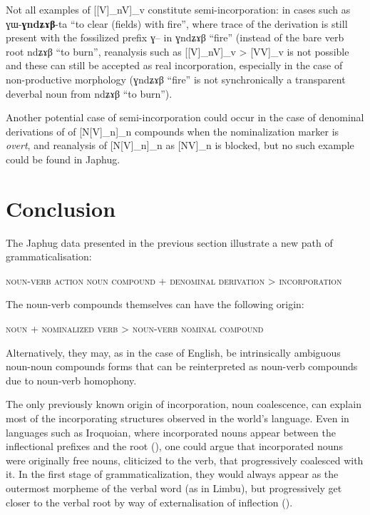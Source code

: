 \documentclass[oldfontcommands,oneside,a4paper,11pt]{article}
\newcommand{\ipa}[1]{{\phon #1}} %
\begin{document}
Not all examples of [[V]_nV]_v constitute semi-incorporation: in cases such as \ipa{ɣɯ-\textbf{ɣndʑɤβ}-ta} ``to clear (fields) with fire'', where trace of the derivation is still present with the  fossilized prefix \ipa{ɣ}-- in \ipa{ɣndʑɤβ} ``fire'' (instead of the bare verb root \ipa{ndʑɤβ} ``to burn'', reanalysis such as [[V]_nV]_v > [VV]_v is not possible and these can still be accepted as real incorporation, especially in the case of non-productive morphology (\ipa{ɣndʑɤβ} ``fire'' is not synchronically a transparent deverbal noun from \ipa{ndʑɤβ} ``to burn'').

Another potential case of semi-incorporation could occur in the case of denominal derivations of  of [N[V]_n]_n compounds  when the nominalization marker is \textit{overt}, and reanalysis of [N[V]_n]_n as [NV]_n is blocked, but no such example could be found in Japhug.

\section{Conclusion}
The Japhug data presented in the previous section illustrate a new path of grammaticalisation:

 \begin{exe}
\ex
 \glt  \textsc{noun-verb action noun compound} + \textsc{denominal derivation} > \textsc{incorporation}
\end{exe} 

The noun-verb compounds themselves can have the following origin:
 \begin{exe}
\ex
 \glt  \textsc{noun} + \textsc{nominalized verb} > \textsc{noun-verb nominal compound}
\end{exe} 
Alternatively, they may, as in the case of English, be intrinsically ambiguous noun-noun compounds forms that can be reinterpreted as noun-verb compounds due to noun-verb homophony.
 

 
 
The only previously known origin of incorporation, noun coalescence, can explain most of the incorporating structures observed in the world's language. Even in languages such as Iroquoian, where incorporated nouns appear between the inflectional prefixes and the root (\citealt{mithun00reordering}), one could argue that incorporated nouns were originally free nouns, cliticized to the verb, that progressively coalesced with it. In the first stage of grammaticalization, they would always appear as the outermost morpheme of the verbal word (as in Limbu), but progressively get closer to the verbal root by way of  externalisation of inflection (\citealt{haspelmath93extern}).
\end{document}
